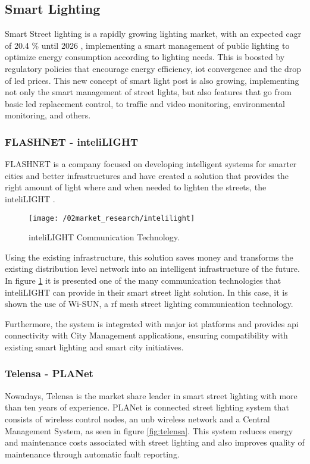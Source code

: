 \subsection{Smart Lighting}
Smart Street lighting is a rapidly growing lighting market, with an expected \ac{cagr} of 20.4 \% until 2026 \cite{smart_light_market}, implementing a smart management of public lighting to optimize energy consumption according to lighting needs. This is boosted by regulatory policies that encourage energy efficiency, \ac{iot} convergence and the drop of \ac{led} prices. This new concept of smart light post is also growing, implementing not only the smart management of street lights, but also features that go from basic \ac{led} replacement control, to traffic and video monitoring, environmental monitoring, and others. 

\subsubsection{FLASHNET - inteliLIGHT}
FLASHNET is a company focused on developing intelligent systems for smarter cities and better infrastructures and have created a solution that provides the right amount of light where and when needed to lighten the streets, the inteliLIGHT \cite{inteli_light}.

\begin{figure}[ht]
	\centering
	\texttt{[image: /02market\_research/intelilight]}
	\caption{inteliLIGHT Communication Technology.}
	\label{fig:intelilight}
\end{figure}

\clearpage
Using the existing infrastructure, this solution saves money and transforms the existing distribution level network into an intelligent infrastructure of the future. In figure \ref{fig:intelilight} it is presented one of the many communication technologies that inteliLIGHT can provide in their smart street light solution. In this case, it is shown the use of Wi-SUN, a \ac{rf} mesh street lighting communication technology.

Furthermore, the system is integrated with major \ac{iot} platforms and provides \ac{api} connectivity with City Management applications, ensuring compatibility with existing smart lighting and smart city initiatives.


\subsubsection{Telensa - PLANet}
Nowadays, Telensa is the market share leader in smart street lighting with more than ten years of experience.\cite{telensa_solutions} PLANet is connected street lighting system that consists of wireless control nodes, an \ac{unb} wireless network and a Central Management System, as seen in figure \ref{fig:telensa}. This system reduces energy and maintenance costs associated with street lighting and also improves quality of maintenance through automatic fault reporting.

